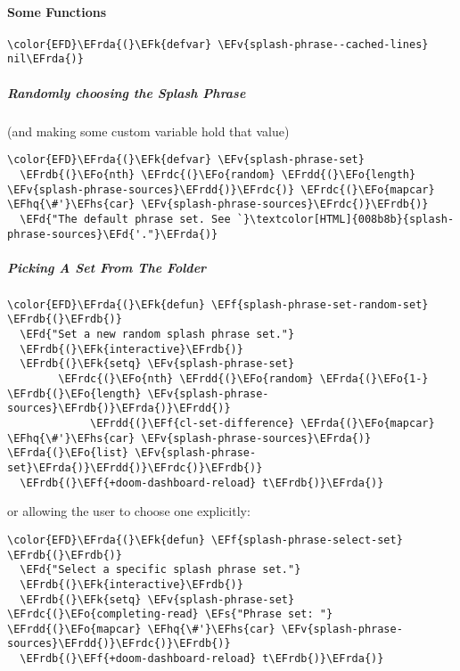 \documentclass{article}
\newcommand{\EFs}[1]{\textcolor{EFs}{#1}} %
\newcommand{\EFd}[1]{\textcolor{EFd}{#1}} %
\newcommand{\EFk}[1]{\textcolor{EFk}{#1}} %
\newcommand{\EFf}[1]{\textcolor{EFf}{#1}} %
\newcommand{\EFv}[1]{\textcolor{EFv}{#1}} %
\newcommand{\EFo}[1]{\textcolor{EFo}{#1}} %
\newcommand{\EFhq}[1]{#1} %
\newcommand{\EFhs}[1]{\textcolor{EFhs}{#1}} %
\newcommand{\EFrda}[1]{\textcolor{EFrda}{#1}} %
\newcommand{\EFrdb}[1]{\textcolor{EFrdb}{#1}} %
\newcommand{\EFrdc}[1]{\textcolor{EFrdc}{#1}} %
\newcommand{\EFrdd}[1]{\textcolor{EFrdd}{#1}} %
\begin{document}
\paragraph{Some Functions}
\label{sec:org278d265}
\begin{Code}
\begin{Verbatim}
\color{EFD}\EFrda{(}\EFk{defvar} \EFv{splash-phrase--cached-lines} nil\EFrda{)}
\end{Verbatim}
\end{Code}
\subparagraph{Randomly choosing the Splash Phrase}
\label{sec:org0ef81de}
(and making some custom variable hold that value)
\begin{Code}
\begin{Verbatim}
\color{EFD}\EFrda{(}\EFk{defvar} \EFv{splash-phrase-set}
  \EFrdb{(}\EFo{nth} \EFrdc{(}\EFo{random} \EFrdd{(}\EFo{length} \EFv{splash-phrase-sources}\EFrdd{)}\EFrdc{)} \EFrdc{(}\EFo{mapcar} \EFhq{\#'}\EFhs{car} \EFv{splash-phrase-sources}\EFrdc{)}\EFrdb{)}
  \EFd{"The default phrase set. See `}\textcolor[HTML]{008b8b}{splash-phrase-sources}\EFd{'."}\EFrda{)}
\end{Verbatim}
\end{Code}
\subparagraph{Picking A Set From The Folder}
\label{sec:org3ca97d0}
\begin{Code}
\begin{Verbatim}
\color{EFD}\EFrda{(}\EFk{defun} \EFf{splash-phrase-set-random-set} \EFrdb{(}\EFrdb{)}
  \EFd{"Set a new random splash phrase set."}
  \EFrdb{(}\EFk{interactive}\EFrdb{)}
  \EFrdb{(}\EFk{setq} \EFv{splash-phrase-set}
        \EFrdc{(}\EFo{nth} \EFrdd{(}\EFo{random} \EFrda{(}\EFo{1-} \EFrdb{(}\EFo{length} \EFv{splash-phrase-sources}\EFrdb{)}\EFrda{)}\EFrdd{)}
             \EFrdd{(}\EFf{cl-set-difference} \EFrda{(}\EFo{mapcar} \EFhq{\#'}\EFhs{car} \EFv{splash-phrase-sources}\EFrda{)} \EFrda{(}\EFo{list} \EFv{splash-phrase-set}\EFrda{)}\EFrdd{)}\EFrdc{)}\EFrdb{)}
  \EFrdb{(}\EFf{+doom-dashboard-reload} t\EFrdb{)}\EFrda{)}
\end{Verbatim}
\end{Code}
or allowing the user to choose one explicitly:
\begin{Code}
\begin{Verbatim}
\color{EFD}\EFrda{(}\EFk{defun} \EFf{splash-phrase-select-set} \EFrdb{(}\EFrdb{)}
  \EFd{"Select a specific splash phrase set."}
  \EFrdb{(}\EFk{interactive}\EFrdb{)}
  \EFrdb{(}\EFk{setq} \EFv{splash-phrase-set} \EFrdc{(}\EFo{completing-read} \EFs{"Phrase set: "} \EFrdd{(}\EFo{mapcar} \EFhq{\#'}\EFhs{car} \EFv{splash-phrase-sources}\EFrdd{)}\EFrdc{)}\EFrdb{)}
  \EFrdb{(}\EFf{+doom-dashboard-reload} t\EFrdb{)}\EFrda{)}
\end{Verbatim}
\end{Code}
\end{document}
